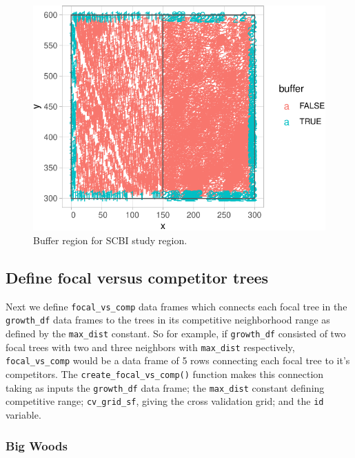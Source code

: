 \documentclass[12pt]{article}
\newenvironment{Shaded}{\begin{snugshade}}{\end{snugshade}}
\newcommand{\DataTypeTok}[1]{\textcolor[rgb]{0.13,0.29,0.53}{#1}}
\newcommand{\KeywordTok}[1]{\textcolor[rgb]{0.13,0.29,0.53}{\textbf{#1}}}
\newcommand{\NormalTok}[1]{#1}
\newcommand{\OperatorTok}[1]{\textcolor[rgb]{0.81,0.36,0.00}{\textbf{#1}}}
\newcommand{\StringTok}[1]{\textcolor[rgb]{0.31,0.60,0.02}{#1}}
\begin{document}
\begin{figure}

{\centering \includegraphics[width=0.5\linewidth]{Figures/scbi-define-cv-folds-1} 

}

\caption{Buffer region for SCBI study region.}\label{fig:scbi-define-cv-folds}
\end{figure}

\hypertarget{define-focal-versus-competitor-trees}{%
\subsection{Define focal versus competitor
trees}\label{define-focal-versus-competitor-trees}}

Next we define \texttt{focal\_vs\_comp} data frames which connects each
focal tree in the \texttt{growth\_df} data frames to the trees in its
competitive neighborhood range as defined by the \texttt{max\_dist}
constant. So for example, if \texttt{growth\_df} consisted of two focal
trees with two and three neighbors with \texttt{max\_dist} respectively,
\texttt{focal\_vs\_comp} would be a data frame of 5 rows connecting each
focal tree to it's competitors. The \texttt{create\_focal\_vs\_comp()}
function makes this connection taking as inputs the \texttt{growth\_df}
data frame; the \texttt{max\_dist} constant defining competitive range;
\texttt{cv\_grid\_sf}, giving the cross validation grid; and the
\texttt{id} variable.

\hypertarget{big-woods-3}{%
\subsubsection{Big Woods}\label{big-woods-3}}

\begin{Shaded}
\end{Shaded}
\end{document}
